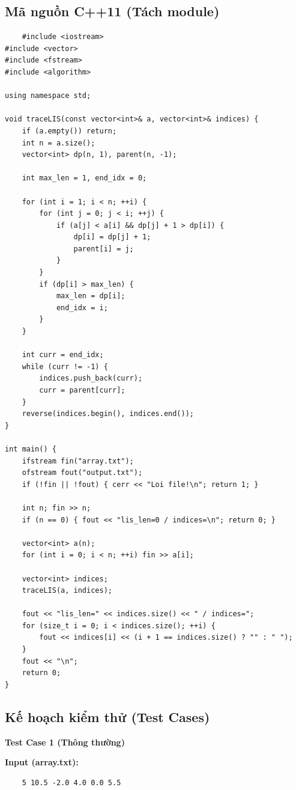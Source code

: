 \subsection{Mã nguồn C++11 (Tách module)}
    \begin{lstlisting}
    #include <iostream>
#include <vector>
#include <fstream>
#include <algorithm>

using namespace std;

void traceLIS(const vector<int>& a, vector<int>& indices) {
    if (a.empty()) return;
    int n = a.size();
    vector<int> dp(n, 1), parent(n, -1);
    
    int max_len = 1, end_idx = 0;
    
    for (int i = 1; i < n; ++i) {
        for (int j = 0; j < i; ++j) {
            if (a[j] < a[i] && dp[j] + 1 > dp[i]) {
                dp[i] = dp[j] + 1;
                parent[i] = j;
            }
        }
        if (dp[i] > max_len) {
            max_len = dp[i];
            end_idx = i;
        }
    }

    int curr = end_idx;
    while (curr != -1) {
        indices.push_back(curr);
        curr = parent[curr];
    }
    reverse(indices.begin(), indices.end());
}

int main() {
    ifstream fin("array.txt");
    ofstream fout("output.txt");
    if (!fin || !fout) { cerr << "Loi file!\n"; return 1; }

    int n; fin >> n;
    if (n == 0) { fout << "lis_len=0 / indices=\n"; return 0; }

    vector<int> a(n);
    for (int i = 0; i < n; ++i) fin >> a[i];

    vector<int> indices;
    traceLIS(a, indices);
    
    fout << "lis_len=" << indices.size() << " / indices=";
    for (size_t i = 0; i < indices.size(); ++i) {
        fout << indices[i] << (i + 1 == indices.size() ? "" : " ");
    }
    fout << "\n";
    return 0;
}
\end{lstlisting}

\subsection{Kế hoạch kiểm thử (Test Cases)}

    \textbf{Test Case 1 (Thông thường)}

    \textbf{Input (array.txt):}
    \begin{lstlisting}
    5 10.5 -2.0 4.0 0.0 5.5\end{lstlisting}


